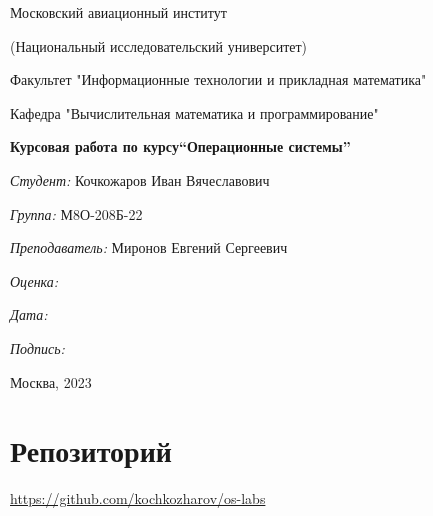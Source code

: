 \documentclass[a4paper, 12pt]{article}
\begin{document}
\thispagestyle{empty}
\begin{center}
    Московский авиационный институт

    (Национальный исследовательский университет)

    Факультет "Информационные технологии и прикладная математика"

    Кафедра "Вычислительная математика и программирование"

\end{center}
\vspace{40ex}
\begin{center}
    \textbf{\large{Курсовая работа по курсу\linebreak \textquotedblleft Операционные системы\textquotedblright}}
\end{center}
\vspace{35ex}
\begin{flushright}
    \textit{Студент: } Кочкожаров Иван Вячеславович

    \vspace{2ex}
    \textit{Группа: } М8О-208Б-22

    \vspace{2ex}
    \textit{Преподаватель: } Миронов Евгений Сергеевич

    \vspace{2ex}
    \textit{Оценка: } \underline{\quad\quad\quad\quad\quad\quad}

    \vspace{2ex}
    \textit{Дата: } \underline{\quad\quad\quad\quad\quad\quad}

    \vspace{2ex}
    \textit{Подпись: } \underline{\quad\quad\quad\quad\quad\quad}

\end{flushright}

\vspace{5ex}

\begin{vfill}
    \begin{center}
        Москва, 2023
    \end{center}
\end{vfill}
\newpage


\begingroup
\color{black}
\tableofcontents\newpage
\endgroup

\section{Репозиторий}
\href{https://github.com/kochkozharov/os-labs}{https://github.com/kochkozharov/os-labs}
\end{document}

